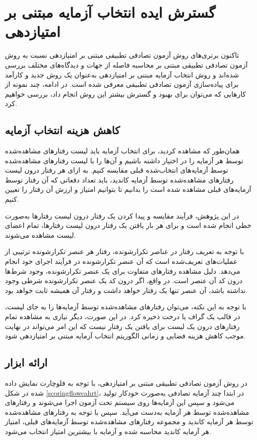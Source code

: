 \section{گسترش ایده انتخاب آزمایه مبتنی بر امتیازدهی}

تاکنون برتری‌های روش آزمون تصادفی تطبیقی مبتنی بر امتیازدهی نسبت به روش آزمون تصادفی تطبیقی مبتنی بر محاسبه فاصله از جهات و دیدگاه‌های مختلف بررسی شده‌اند و روش انتخاب آزمایه مبتنی بر امتیازدهی به‌عنوان یک روش جدید و کارآمد برای پیاده‌سازی آزمون تصادفی تطبیقی معرفی شده است. در ادامه، چند نمونه از کارهایی که می‌توان برای بهبود و گسترش بیشتر این روش انجام داد، بررسی خواهیم کرد.

\subsection{کاهش هزینه انتخاب آزمایه}

همان‌طور که مشاهده کردید، برای انتخاب آزمایه باید لیست رفتارهای مشاهده‌شده توسط هر آزمایه را در اختیار داشته باشیم و آن‌ها را با لیست رفتارهای مشاهده‌شده توسط آزمایه‌های انتخاب‌شده قبلی مقایسه کنیم. به ازای هر رفتار درون لیست رفتارهای مشاهده‌شده توسط آزمایه کاندید، باید تعداد دفعاتی که آن رفتار توسط آزمایه‌های قبلی مشاهده شده است را بدانیم تا بتوانیم امتیاز و ارزش آن رفتار را تعیین کنیم.

در این پژوهش، فرآیند مقایسه و پیدا کردن یک رفتار درون لیست رفتارها به‌صورت خطی انجام شده است و برای هر بار یافتن یک رفتار درون لیست رفتارها، تمام اعضای لیست مشاهده می‌شوند.

با توجه به تعریف رفتار در عناصر تکرارشونده، رفتار هر عنصر تکرارشونده ترتیبی از عملیات‌های تعریف‌شده است که آن عنصر تکرارشونده در فرآیند اجرای خود انجام می‌دهد. دلیل مشاهده رفتارهای متفاوت برای یک عنصر تکرارشونده، وجود شرط‌ها درون کد آن عنصر است. در واقع، اگر درون کد یک عنصر تکرارشونده شرطی وجود نداشته باشد، آن عنصر تنها یک رفتار خواهد داشت و رفتار آن همیشه ثابت خواهد بود.

با توجه به این نکته، می‌توان رفتارهای مشاهده‌شده توسط آزمایه‌ها را به جای لیست، در قالب یک گراف یا درخت ذخیره کرد. در این صورت، دیگر نیازی به مشاهده تمام رفتارهای درون یک لیست برای یافتن یک رفتار نیست که این امر می‌تواند در نهایت موجب کاهش هزینه فضایی و زمانی الگوریتم انتخاب آزمایه مبتنی بر امتیازدهی شود.

\subsection{ارائه ابزار}

در روش آزمون تصادفی تطبیقی مبتنی بر امتیازدهی، با توجه به فلوچارت نمایش داده شده در شکل \ref{scoringflowcahrt}، در ابتدا چند آزمایه تصادفی به‌صورت خودکار تولید می‌شود و سپس این آزمایه‌ها روی سیستم تحت آزمون اجرا می‌شوند و رفتارهای مشاهده‌شده توسط هر آزمایه به‌دست می‌آید. سپس با توجه به رفتارهای مشاهده‌شده توسط هر آزمایه کاندید و مجموعه رفتارهای مشاهده‌شده توسط آزمایه‌های قبلی، امتیاز هر آزمایه کاندید محاسبه شده و آزمایه با بیشترین امتیاز انتخاب می‌شود.

